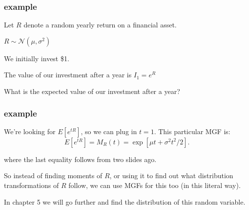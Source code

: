 \documentclass{beamer}
\begin{document}

\begin{frame}
\frametitle{example}

Let $R$ denote a random yearly return on a financial asset. 

$R \sim \mathcal{N}(\mu, \sigma^2)$

We initially invest \$1. 

The value of our investment after a year is $I_1 = e^{R}$

What is the expected value of our investment after a year?


\end{frame}

\begin{frame}
\frametitle{example}

We're looking for $E[e^{tR}]$, so we can plug in $t=1$. This particular MGF is:
\[
E[e^{tR}] = M_R(t) = \exp\left[\mu t + \sigma^2t^2/2 \right].
\]

where the last equality follows from two slides ago.
\newline

So instead of finding moments of $R$, or using it to find out what distribution transformations of $R$ follow, we can use MGFs for this too (in this literal way).
\newline

In chapter 5 we will go further and find the distribution of this random variable.
\end{frame}

\end{document}
